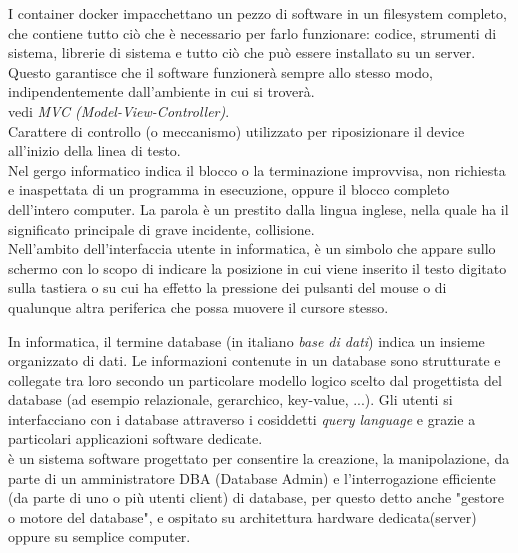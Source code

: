\documentclass{scalatekids-article}
\begin{document}
 I container docker impacchettano un pezzo di software in un filesystem completo, che contiene tutto ciò che è necessario per farlo funzionare: codice, strumenti di sistema, librerie di sistema e tutto ciò che può essere installato su un server.
Questo garantisce che il software funzionerà sempre allo stesso modo, indipendentemente dall'ambiente in cui si troverà.
\\

 vedi \textit{MVC (Model-View-Controller)}.
\\

 Carattere di controllo (o meccanismo) utilizzato per riposizionare il device all'inizio della linea di testo.
\\

 Nel gergo informatico indica il blocco o la terminazione improvvisa, non richiesta e inaspettata di un programma in esecuzione, oppure il blocco completo dell'intero computer.
La parola è un prestito dalla lingua inglese, nella quale ha il significato principale di grave incidente, collisione.
\\

 Nell'ambito dell'interfaccia utente in informatica, è un simbolo che appare sullo schermo con lo scopo di indicare la posizione in cui viene inserito il testo digitato sulla tastiera o su cui ha effetto la pressione dei pulsanti del mouse o di qualunque altra periferica che possa muovere il cursore stesso.
\\


 In informatica, il termine database (in italiano \textit{base di dati}) indica un insieme organizzato di dati.
Le informazioni contenute in un database sono strutturate e collegate tra loro secondo un particolare modello logico scelto dal progettista del database (ad esempio relazionale, gerarchico, key-value, ...).
Gli utenti si interfacciano con i database attraverso i cosiddetti \textit{query language} e grazie a particolari applicazioni software dedicate.
\\

 è un sistema software progettato per consentire la creazione, la manipolazione, da parte di un amministratore DBA (Database Admin) e l'interrogazione efficiente (da parte di uno o più utenti client) di database, per questo detto anche "gestore o motore del database", e ospitato su architettura hardware dedicata(server) oppure su semplice computer.
\\
\end{document}
